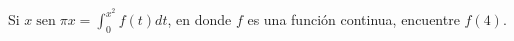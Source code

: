 \item Si $x \operatorname{sen} \pi x = \int_0^{x^2} f(t) dt$, en donde $f$ es una función continua, encuentre $f(4)$.
